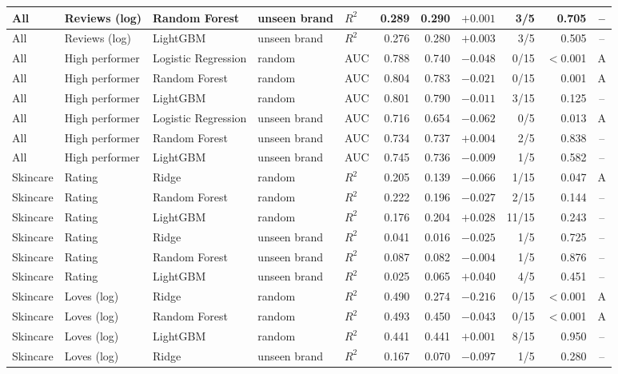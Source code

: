 \begin{table}[htbp]
\begin{tabular}{|l|l|l|l|l|r|r|r|r|r|c|}
\hline
All & Reviews (log) & Random Forest & unseen brand & $R^2$ & 0.289 & 0.290 & $+0.001$ & 3/5 & 0.705 & -- \\
\hline
All & Reviews (log) & LightGBM & unseen brand & $R^2$ & 0.276 & 0.280 & $+0.003$ & 3/5 & 0.505 & -- \\
\hline
All & High performer & Logistic Regression & random & AUC & 0.788 & 0.740 & $-0.048$ & 0/15 & $<$0.001 & A \\
\hline
All & High performer & Random Forest & random & AUC & 0.804 & 0.783 & $-0.021$ & 0/15 & 0.001 & A \\
\hline
All & High performer & LightGBM & random & AUC & 0.801 & 0.790 & $-0.011$ & 3/15 & 0.125 & -- \\
\hline
All & High performer & Logistic Regression & unseen brand & AUC & 0.716 & 0.654 & $-0.062$ & 0/5 & 0.013 & A \\
\hline
All & High performer & Random Forest & unseen brand & AUC & 0.734 & 0.737 & $+0.004$ & 2/5 & 0.838 & -- \\
\hline
All & High performer & LightGBM & unseen brand & AUC & 0.745 & 0.736 & $-0.009$ & 1/5 & 0.582 & -- \\
\hline
\hline
Skincare & Rating & Ridge & random & $R^2$ & 0.205 & 0.139 & $-0.066$ & 1/15 & 0.047 & A \\
\hline
Skincare & Rating & Random Forest & random & $R^2$ & 0.222 & 0.196 & $-0.027$ & 2/15 & 0.144 & -- \\
\hline
Skincare & Rating & LightGBM & random & $R^2$ & 0.176 & 0.204 & $+0.028$ & 11/15 & 0.243 & -- \\
\hline
Skincare & Rating & Ridge & unseen brand & $R^2$ & 0.041 & 0.016 & $-0.025$ & 1/5 & 0.725 & -- \\
\hline
Skincare & Rating & Random Forest & unseen brand & $R^2$ & 0.087 & 0.082 & $-0.004$ & 1/5 & 0.876 & -- \\
\hline
Skincare & Rating & LightGBM & unseen brand & $R^2$ & 0.025 & 0.065 & $+0.040$ & 4/5 & 0.451 & -- \\
\hline
Skincare & Loves (log) & Ridge & random & $R^2$ & 0.490 & 0.274 & $-0.216$ & 0/15 & $<$0.001 & A \\
\hline
Skincare & Loves (log) & Random Forest & random & $R^2$ & 0.493 & 0.450 & $-0.043$ & 0/15 & $<$0.001 & A \\
\hline
Skincare & Loves (log) & LightGBM & random & $R^2$ & 0.441 & 0.441 & $+0.001$ & 8/15 & 0.950 & -- \\
\hline
Skincare & Loves (log) & Ridge & unseen brand & $R^2$ & 0.167 & 0.070 & $-0.097$ & 1/5 & 0.280 & -- \\

\end{tabular}
\end{table}
